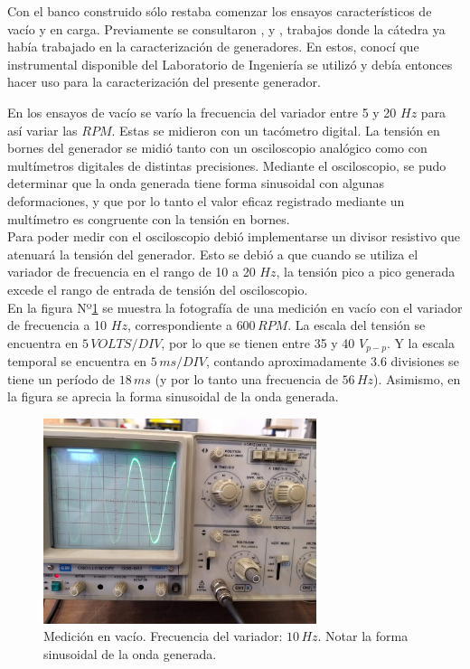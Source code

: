 \documentclass[a4paper,11pt,twoside]{IT-CNEA}
\begin{document}
\par Con el banco construido sólo restaba comenzar los ensayos característicos de vacío y en carga. Previamente se consultaron \cite{generador1}, \cite{generador2} y \cite{generador3}, trabajos donde la cátedra ya había trabajado en la caracterización de generadores. En estos, conocí que instrumental disponible del Laboratorio de Ingeniería se utilizó y debía entonces hacer uso para la caracterización del presente generador.
\par En los ensayos de vacío se varío la frecuencia del variador entre 5 y 20 $Hz$ para así variar las $RPM$. Estas se midieron con un tacómetro digital. La tensión en bornes del generador se midió tanto con un osciloscopio analógico como con multímetros digitales de distintas precisiones. Mediante el osciloscopio, se pudo determinar que la onda generada tiene forma sinusoidal con algunas deformaciones, y que por lo tanto el valor eficaz registrado mediante un multímetro es congruente con la tensión en bornes. 
\\ Para poder medir con el osciloscopio debió implementarse un divisor resistivo que atenuará la tensión del generador. Esto se debió a que cuando se utiliza el variador de frecuencia en el rango de 10 a 20 $Hz$, la tensión pico a pico generada excede el rango de entrada de tensión del osciloscopio.
\\ En la figura Nº\ref{fig:OsciloscopioVacio} se muestra la fotografía de una medición en vacío con el variador de frecuencia a 10 $Hz$, correspondiente a $600\,RPM$. La escala del tensión se encuentra en $5\,VOLTS/DIV$, por lo que se tienen entre 35 y 40 $V_{p-p}$. Y la escala temporal se encuentra en $5\,ms/DIV$, contando aproximadamente $3.6$ divisiones se tiene un período de $18\,ms$ (y por lo tanto una frecuencia de $56\,Hz$). Asimismo, en la figura se aprecia la forma sinusoidal de la onda generada. 
\begin{figure}[h!]
\centering
\includegraphics[width=8cm]{Figuras/OsciloscopioVacio.jpg}
\caption{Medición en vacío. Frecuencia del variador: $10\,Hz$. Notar la forma sinusoidal de la onda generada.}
\label{fig:OsciloscopioVacio}
\end{figure}
\end{document}
